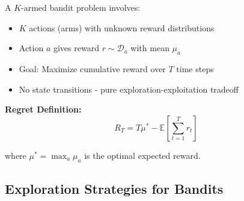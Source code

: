 A $K$-armed bandit problem involves:
\begin{itemize}
    \item $K$ actions (arms) with unknown reward distributions
    \item Action $a$ gives reward $r \sim \mathcal{D}_a$ with mean $\mu_a$
    \item Goal: Maximize cumulative reward over $T$ time steps
    \item No state transitions - pure exploration-exploitation tradeoff
\end{itemize}

\textbf{Regret Definition:}
\begin{equation}
R_T = T \mu^* - \mathbb{E} \left[ \sum_{t=1}^T r_t \right]
\end{equation}

where $\mu^* = \max_a \mu_a$ is the optimal expected reward.

\subsection{Exploration Strategies for Bandits}

